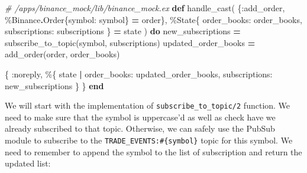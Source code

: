 \documentclass[
]{book}
\newenvironment{Shaded}{\begin{snugshade}}{\end{snugshade}}
\newcommand{\CommentTok}[1]{\textcolor[rgb]{0.56,0.35,0.01}{\textit{#1}}}
\newcommand{\ConstantTok}[1]{\textcolor[rgb]{0.00,0.00,0.00}{#1}}
\newcommand{\KeywordTok}[1]{\textcolor[rgb]{0.13,0.29,0.53}{\textbf{#1}}}
\newcommand{\NormalTok}[1]{#1}
\newcommand{\OperatorTok}[1]{\textcolor[rgb]{0.81,0.36,0.00}{\textbf{#1}}}
\newcommand{\VariableTok}[1]{\textcolor[rgb]{0.00,0.00,0.00}{#1}}
\begin{document}
\begin{Shaded}
\begin{Highlighting}[]
\CommentTok{\# /apps/binance\_mock/lib/binance\_mock.ex}
  \KeywordTok{def}\NormalTok{ handle\_cast(}
\NormalTok{        \{}\VariableTok{:add\_order}\NormalTok{, \%}\ConstantTok{Binance}\OperatorTok{.}\ConstantTok{Order}\NormalTok{\{}\VariableTok{symbol:}\NormalTok{ symbol\} }\OperatorTok{=}\NormalTok{ order\},}
\NormalTok{        \%}\ConstantTok{State}\NormalTok{\{}
          \VariableTok{order\_books:}\NormalTok{ order\_books,}
          \VariableTok{subscriptions:}\NormalTok{ subscriptions}
\NormalTok{        \} }\OperatorTok{=}\NormalTok{ state}
\NormalTok{      ) }\KeywordTok{do}
\NormalTok{    new\_subscriptions }\OperatorTok{=}\NormalTok{ subscribe\_to\_topic(symbol, subscriptions)}
\NormalTok{    updated\_order\_books }\OperatorTok{=}\NormalTok{ add\_order(order, order\_books)}

\NormalTok{    \{}
      \VariableTok{:noreply}\NormalTok{,}
\NormalTok{      \%\{}
\NormalTok{        state}
        \OperatorTok{|} \VariableTok{order\_books:}\NormalTok{ updated\_order\_books,}
          \VariableTok{subscriptions:}\NormalTok{ new\_subscriptions}
\NormalTok{      \}}
\NormalTok{    \}}
  \KeywordTok{end}
\end{Highlighting}
\end{Shaded}

We will start with the implementation of \texttt{subscribe\_to\_topic/2} function. We need to make sure that the symbol is uppercase'd as well as check have we already subscribed to that topic. Otherwise, we can safely use the PubSub module to subscribe to the \texttt{TRADE\_EVENTS:\#\{symbol\}} topic for this symbol.
We need to remember to append the symbol to the list of subscription and return the updated list:
\end{document}
